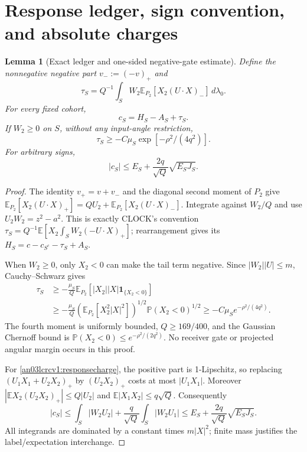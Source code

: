 \documentclass[11pt]{article}
\newtheorem{lemma}[theorem]{Lemma}
\theoremstyle{remark}\newtheorem{remark}[theorem]{Remark}
\newcommand{\E}{\mathbb E}
\newcommand{\dd}{\,d}
\newcommand{\one}{\mathbf1}
\begin{document}
\section{Response ledger, sign convention, and absolute charges}
\begin{lemma}[Exact ledger and one-sided negative-gate estimate]
\label{an03lcrcv1:ledger}
Define the nonnegative negative part $v_-:=(-v)_+$ and
\[
 \tau_S=Q^{-1}\int_S W_2\E_{P_2}[X_2(U\cdot X)_-]\dd\lambda_0.
\]
For every fixed cohort,
\begin{equation}\label{an03lcrcv1:identity}
 c_S=H_S-A_S+\tau_S.
\end{equation}
If $W_2\ge0$ on $S$, without any input-angle restriction,
\begin{equation}\label{an03lcrcv1:taulower}
 \tau_S\ge-C\mu_S\exp[-\rho^2/(4q^2)].
\end{equation}
For arbitrary signs,
\begin{equation}\label{an03lcrcv1:responsecharge}
 |c_S|\le E_S+\frac{2q}{\sqrt Q}\sqrt{E_SJ_S}.
\end{equation}
\end{lemma}
\begin{proof}
The identity $v_+=v+v_-$ and the diagonal second moment of $P_2$
give $\E_{P_2}[X_2(U\cdot X)_+]=QU_2+
\E_{P_2}[X_2(U\cdot X)_-]$. Integrate against $W_2/Q$ and use
$U_2W_2=z^2-a^2$. This is exactly CLOCK's convention
$\tau_S=Q^{-1}\E[X_2\int_S W_2(-U\cdot X)_+]$;
rearrangement gives its $H_S=c-c_{S^c}-\tau_S+A_S$.

When $W_2\ge0$, only $X_2<0$ can make the tail term negative.
Since $|W_2||U|\le m$, Cauchy--Schwarz gives
\begin{align*}
 \tau_S&\ge-\frac{\mu_S}{Q}
 \E_{P_2}[|X_2||X|\one_{\{X_2<0\}}]\\
 &\ge-\frac{\mu_S}{Q}
 (\E_{P_2}[X_2^2|X|^2])^{1/2}
 \mathbb P(X_2<0)^{1/2}
 \ge-C\mu_S e^{-\rho^2/(4q^2)}.
\end{align*}
The fourth moment is uniformly bounded, $Q\ge169/400$, and the
Gaussian Chernoff bound is $\mathbb P(X_2<0)\le e^{-\rho^2/(2q^2)}$.
No receiver gate or projected angular margin occurs in this proof.

For \eqref{an03lcrcv1:responsecharge}, the positive part is
1-Lipschitz, so replacing $(U_1X_1+U_2X_2)_+$ by $(U_2X_2)_+$
costs at most $|U_1X_1|$. Moreover
$|\E X_2(U_2X_2)_+|\le Q|U_2|$ and
$\E|X_1X_2|\le q\sqrt Q$. Consequently
\[
 |c_S|\le\int_S|W_2U_2|+\frac q{\sqrt Q}\int_S|W_2U_1|
 \le E_S+\frac{2q}{\sqrt Q}\sqrt{E_SJ_S}.
\]
All integrands are dominated by a constant times $m|X|^2$;
finite mass justifies the label/expectation interchange.
\end{proof}
\end{document}
